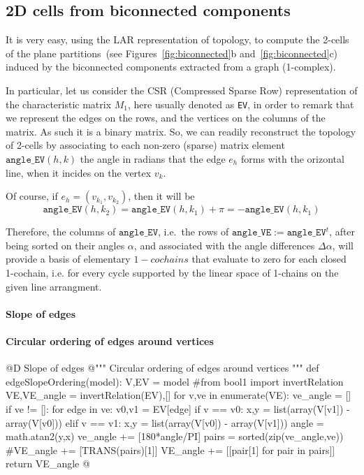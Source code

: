 \documentclass[11pt,oneside]{article}    %
\begin{document}
\subsection{2D cells from biconnected components}

It is very easy,  using the LAR representation of topology, to compute the 2-cells of the plane partitions~(see Figures~\ref{fig:biconnected}b and~\ref{fig:biconnected}c) induced by the biconnected components extracted from a graph (1-complex).

In particular, let us consider the CSR (Compressed Sparse Row) representation of the characteristic matrix $M_1$, here usually denoted as \texttt{EV}, in order to remark that we represent the edges on the rows, and the vertices on the columns of the matrix. As such it is a binary matrix. So, we can readily reconstruct the topology of 2-cells by associating to each non-zero (sparse) matrix element $\texttt{angle\_EV}(h,k)$ the angle in radians that the edge $e_h$ forms with the orizontal line, when it incides on the vertex $v_k$. 

Of course, if $e_h = (v_{k_1},v_{k_2})$, then it will be 
\[
\texttt{angle\_EV}(h,k_2) = \texttt{angle\_EV}(h,k_1)+\pi = -\texttt{angle\_EV}(h,k_1)
\]

Therefore, the columns of $\texttt{angle\_EV}$, i.e.~the rows of $\texttt{angle\_VE} := \texttt{angle\_EV}^t$,
after being sorted on their angles $\alpha$, and associated with the angle differences $\Delta\alpha$, will provide a basis of elementary $1-cochains$ that evaluate to zero for each closed 1-cochain, i.e. for every cycle supported by the linear space of 1-chains on the given line arrangment.


\paragraph{Slope of edges}

\paragraph{Circular ordering of edges around vertices}
@D Slope of edges
@{""" Circular ordering of edges around vertices """
def edgeSlopeOrdering(model):
    V,EV = model
    #from bool1 import invertRelation
    VE,VE_angle = invertRelation(EV),[]
    for v,ve in enumerate(VE):
        ve_angle = []
        if ve != []:
            for edge in ve:
                v0,v1 = EV[edge]
                if v == v0:     x,y = list(array(V[v1]) - array(V[v0]))
                elif v == v1:    x,y = list(array(V[v0]) - array(V[v1]))
                angle = math.atan2(y,x)
                ve_angle += [180*angle/PI]
        pairs = sorted(zip(ve_angle,ve))
        #VE_angle += [TRANS(pairs)[1]]
        VE_angle += [[pair[1] for pair in pairs]]
    return VE_angle
@}
\end{document}
